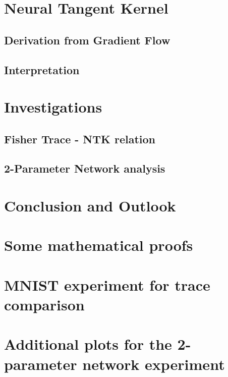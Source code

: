 \documentclass[12pt, twoside, a4paper]{report}
\begin{document}
	
	\chapter{Neural Tangent Kernel}\label{sec:ChapterNTK}
	
	\section{Derivation from Gradient Flow}\label{sec:NTKderivation}
	
	\section{Interpretation}\label{sec:NTKInterpretation}
	
	
	\chapter{Investigations}\label{sec:ChapterResults}
	
	\section{Fisher Trace - NTK relation}\label{sec:Results1}
	
	\section{2-Parameter Network analysis}\label{sec:Results2}
	
	
	\chapter{Conclusion and Outlook}\label{sec:ChapterConcAndOutlook}
	
	
	
	
	\nocite{*}
	\printbibliography[title=Literature]
	\begin{appendices}
		\chapter{Some mathematical proofs}
		
		\chapter{MNIST experiment for trace comparison}
		\label{sec:TraceExperimentAppendix}
		
		\chapter{Additional plots for the 2-parameter network experiment}\label{sec:2ParNetAppendix}
		
	\end{appendices}
	
	
\end{document}
